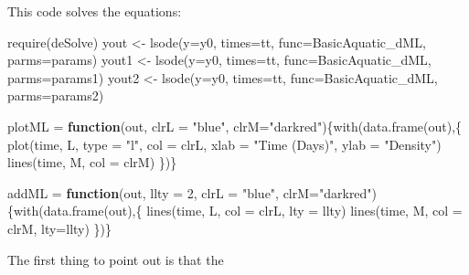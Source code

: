 \documentclass[
]{book}
\newenvironment{Shaded}{\begin{snugshade}}{\end{snugshade}}
\newcommand{\AttributeTok}[1]{\textcolor[rgb]{0.77,0.63,0.00}{#1}}
\newcommand{\ControlFlowTok}[1]{\textcolor[rgb]{0.13,0.29,0.53}{\textbf{#1}}}
\newcommand{\DecValTok}[1]{\textcolor[rgb]{0.00,0.00,0.81}{#1}}
\newcommand{\FunctionTok}[1]{\textcolor[rgb]{0.00,0.00,0.00}{#1}}
\newcommand{\NormalTok}[1]{#1}
\newcommand{\OtherTok}[1]{\textcolor[rgb]{0.56,0.35,0.01}{#1}}
\newcommand{\StringTok}[1]{\textcolor[rgb]{0.31,0.60,0.02}{#1}}
\begin{document}
This code solves the equations:

\begin{Shaded}
\begin{Highlighting}[]
\FunctionTok{require}\NormalTok{(deSolve)}
\NormalTok{yout }\OtherTok{\textless{}{-}} \FunctionTok{lsode}\NormalTok{(}\AttributeTok{y=}\NormalTok{y0, }\AttributeTok{times=}\NormalTok{tt, }\AttributeTok{func=}\NormalTok{BasicAquatic\_dML, }\AttributeTok{parms=}\NormalTok{params) }
\NormalTok{yout1 }\OtherTok{\textless{}{-}} \FunctionTok{lsode}\NormalTok{(}\AttributeTok{y=}\NormalTok{y0, }\AttributeTok{times=}\NormalTok{tt, }\AttributeTok{func=}\NormalTok{BasicAquatic\_dML, }\AttributeTok{parms=}\NormalTok{params1) }
\NormalTok{yout2 }\OtherTok{\textless{}{-}} \FunctionTok{lsode}\NormalTok{(}\AttributeTok{y=}\NormalTok{y0, }\AttributeTok{times=}\NormalTok{tt, }\AttributeTok{func=}\NormalTok{BasicAquatic\_dML, }\AttributeTok{parms=}\NormalTok{params2) }
\end{Highlighting}
\end{Shaded}

\begin{Shaded}
\begin{Highlighting}[]
\NormalTok{plotML }\OtherTok{=} \ControlFlowTok{function}\NormalTok{(out, }\AttributeTok{clrL =} \StringTok{"blue"}\NormalTok{, }\AttributeTok{clrM=}\StringTok{"darkred"}\NormalTok{)\{}\FunctionTok{with}\NormalTok{(}\FunctionTok{data.frame}\NormalTok{(out),\{}
  \FunctionTok{plot}\NormalTok{(time, L, }\AttributeTok{type =} \StringTok{"l"}\NormalTok{, }\AttributeTok{col =}\NormalTok{ clrL, }\AttributeTok{xlab =} \StringTok{"Time (Days)"}\NormalTok{, }\AttributeTok{ylab =} \StringTok{"Density"}\NormalTok{) }
  \FunctionTok{lines}\NormalTok{(time, M, }\AttributeTok{col =}\NormalTok{ clrM) }
\NormalTok{\})\}}

\NormalTok{addML }\OtherTok{=} \ControlFlowTok{function}\NormalTok{(out, }\AttributeTok{llty =} \DecValTok{2}\NormalTok{, }\AttributeTok{clrL =} \StringTok{"blue"}\NormalTok{, }\AttributeTok{clrM=}\StringTok{"darkred"}\NormalTok{)\{}\FunctionTok{with}\NormalTok{(}\FunctionTok{data.frame}\NormalTok{(out),\{}
  \FunctionTok{lines}\NormalTok{(time, L, }\AttributeTok{col =}\NormalTok{ clrL, }\AttributeTok{lty =}\NormalTok{ llty) }
  \FunctionTok{lines}\NormalTok{(time, M, }\AttributeTok{col =}\NormalTok{ clrM, }\AttributeTok{lty=}\NormalTok{llty) }
\NormalTok{\})\}}
\end{Highlighting}
\end{Shaded}

The first thing to point out is that the
\end{document}
